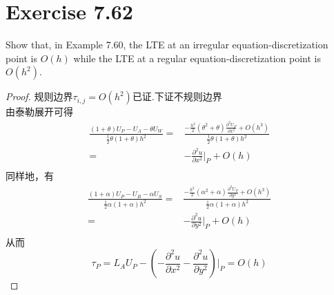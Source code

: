 \documentclass[twoside,a4paper]{ctexart}
\newcommand{\pdfFrac}[2]{\frac{\partial #1}{\partial #2}}
\begin{document}
  \section*{Exercise 7.62}
  Show that, in Example 7.60, the LTE at an irregular equation-discretization point is $O(h)$ while the LTE at a regular equation-discretization point is $O(h^2)$.
  \begin{proof}
    规则边界$\tau_{i,j} = O(h^2)$已证.下证不规则边界\\
    由泰勒展开可得
    \begin{align*}
    \frac{(1+\theta)U_P-U_A-\theta U_W}{\frac{1}{2}\theta(1+\theta)h^2} ={} & \frac{-\frac{h^2}{2}(\theta^2+\theta)\pdfFrac{^2U_P}{x^2}+O(h^3)}{\frac{1}{2}\theta(1+\theta)h^2} \\
    ={} & -\pdfFrac{^2u}{x^2}\bigg|_P + O(h) \\
    \end{align*}
    同样地，有
    \begin{align*}
    \frac{(1+\alpha)U_P-U_B-\alpha U_S}{\frac{1}{2}\alpha(1+\alpha)h^2} ={} & \frac{-\frac{h^2}{2}(\alpha^2+\alpha)\pdfFrac{^2U_P}{y^2}+O(h^3)}{\frac{1}{2}\alpha(1+\alpha)h^2} \\
    ={} & -\pdfFrac{^2u}{y^2}\bigg|_P + O(h) \\
    \end{align*}
    从而
    \begin{equation*}
      \tau_P = L_AU_P - \left( -\pdfFrac{^2u}{x^2} -\pdfFrac{^2u}{y^2}\right)\bigg|_P = O(h)
    \end{equation*}
  \end{proof}
\end{document}
